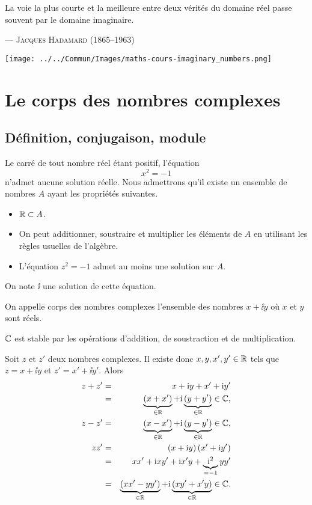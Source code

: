 \documentclass{magnolia}
\begin{document}
\setlength{}
\epigraph{\og La voie la plus courte et la meilleure entre deux vérités du domaine réel passe souvent par le domaine imaginaire. \fg}{--- \textsc{Jacques Hadamard (1865--1963)}}
\bigskip
\hfill\texttt{[image: ../../Commun/Images/maths-cours-imaginary\_numbers.png]}

\magtoc

\section{Le corps des nombres complexes}
\subsection{Définition, conjugaison, module}
Le carré de tout nombre réel étant positif, l'équation
$$x^2=-1$$
n'admet aucune solution réelle. Nous admettrons qu'il existe un ensemble de
nombres $A$ ayant les propriétés suivantes.
\begin{itemize}
  \item $\mathbb{R}\subset A$.
  \item On peut additionner, soustraire et multiplier les éléments de $A$ en
    utilisant les règles usuelles de l'algèbre.
  \item L'équation $z^2=-1$ admet au moins une solution sur $A$.
\end{itemize}
On note $\ii$ une solution de cette équation.

\begin{definition}[utile=-3]
  On appelle corps des nombres complexes l'ensemble des nombres $x+\ii y$ où
  $x$ et $y$ sont réels.
\end{definition}

\begin{remarqueUnique}
\remarque $\mathbb{C}$ est stable par les opérations d'addition, de soustraction et
  de multiplication.
\begin{preuve}
Soit $z$ et $z'$ deux nombres complexes. Il existe donc
$x,y,x',y'\in\mathbb{R}$ tels que $z=x+\ii y$ et $z'=x'+\ii y'$. Alors
\begin{eqnarray*}
z+z' &=& x+{\rm i} y+x'+{\rm i} y'\\
     &=& \underbrace{\left(x+x'\right)}_{\in\mathbb{R}}
         +{\rm i} \underbrace{\left(y+y'\right)}_{\in\mathbb{R}}\in\mathbb{C},\\
z-z' &=& \underbrace{\left(x-x'\right)}_{\in\mathbb{R}}
         +{\rm i} \underbrace{\left(y-y'\right)}_{\in\mathbb{R}}\in\mathbb{C},\\
z z' &=& \left(x+{\rm i} y\right)\left(x'+{\rm i} y'\right)\\
     &=& x x'+{\rm i} x y'+{\rm i} x' y+\underbrace{{\rm i}^2}_{=-1} y y'\\
     &=& \underbrace{\left(x x'-y y'\right)}_{\in\mathbb{R}} +
         {\rm i}\underbrace{\left(x y'+x' y\right)}_{\in\mathbb{R}} \in\mathbb{C}.
\end{eqnarray*}
\end{preuve}
\end{remarqueUnique}
\end{document}
